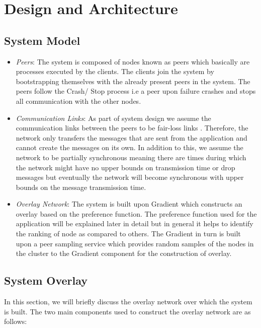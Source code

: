 \documentclass[a4paper,11pt]{kth-mag}
\begin{document}
\chapter{Design and Architecture}
\label{chap:design}

\section{System Model}

\begin{itemize}

\item \textit{Peers}: The system is composed of nodes known as peers which basically are processes executed by the clients. The clients join the system by bootstrapping themselves with the already present peers in the system. The peers follow the Crash/ Stop process \cite{guerraoui} i.e a peer upon failure crashes and stops all communication with the other nodes.


\item \textit{Communication Links}: As part of system design we assume the communication links between the peers to be fair-loss links \cite{guerraoui}. Therefore, the network only transfers the messages that are sent from the application and cannot create the messages on its own. In addition to this, we assume the network to be partially synchronous meaning there are times during which the network might have no upper bounds on transmission time or drop messages but eventually the network will become synchronous with upper bounds on the message transmission time.

\item \textit{Overlay Network}: The system is built upon Gradient \cite{sacha2006discovery} which constructs an overlay based on the preference function. The preference function used for the application will be explained later in detail but in general it helps to identify the ranking of node as compared to others. The Gradient in turn is built upon a peer sampling service which provides random samples of the nodes in the cluster to the Gradient component for the construction of overlay.

\end{itemize}



\section{System Overlay}
In this section, we will briefly discuss the overlay network over which the system is built. The two main components used to construct the overlay network are as follows:
\end{document}
